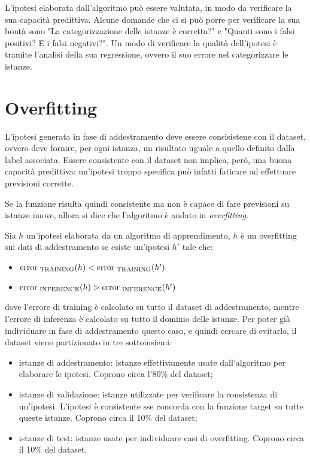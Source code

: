 L'ipotesi elaborata dall'algoritmo può essere valutata, in modo da verificare la sua capacità predittiva. Alcune domande che ci si può porre per verificare la sua bontà sono "La categorizzazione delle istanze è corretta?" e "Quanti sono i falsi positivi? E i falsi negativi?".
Un modo di verificare la qualità dell'ipotesi è tramite l'analisi della sua regressione, ovvero il suo errore nel categorizzare le istanze.

\section{Overfitting}
L'ipotesi generata in fase di addestramento deve essere consisistene con il dataset, ovvero deve fornire, per ogni istanza, un risultato uguale a quello definito dalla label associata.
Essere consistente con il dataset non implica, però, una buona capacità predittiva: un'ipotesi troppo specifica può infatti faticare ad effettuare previsioni corrette.

Se la funzione risulta quindi consistente ma non è capace di fare previsioni su istanze nuove, allora si dice che l'algoritmo è andato in \textit{overfitting}.

Sia $h$ un'ipotesi elaborata da un algoritmo di apprendimento, $h$ è un overfitting sui dati di addestramento se esiste un'ipotesi $h'$ tale che:
\begin{itemize}
    \item $\textnormal{error}_{\textnormal{ TRAINING}} (h) < \textnormal{error}_{\textnormal{ TRAINING}} (h')$
    \item $\textnormal{error}_{\textnormal{ INFERENCE}} (h) > \textnormal{error}_{\textnormal{ INFERENCE}} (h')$
\end{itemize}
dove l'errore di training è calcolato su tutto il dataset di addestramento, mentre l'errore di inferenza è calcolato su tutto il dominio delle istanze.
Per poter già individuare in fase di addestramento questo caso, e quindi cercare di evitarlo, il dataset viene partizionato in tre sottoinsiemi:
\begin{itemize}
    \item istanze di addestramento: istanze effettivamente usate dall'algoritmo per elaborare le ipotesi. Coprono circa l'80\% del dataset;
    \item istanze di validazione: istanze utilizzate per verificare la consistenza di un'ipotesi. L'ipotesi è consistente sse concorda con la funzione target su tutte queste istanze. Coprono circa il 10\% del dataset;
    \item istanze di test: istanze usate per individuare casi di overfitting. Coprono circa il 10\% del dataset.
\end{itemize}